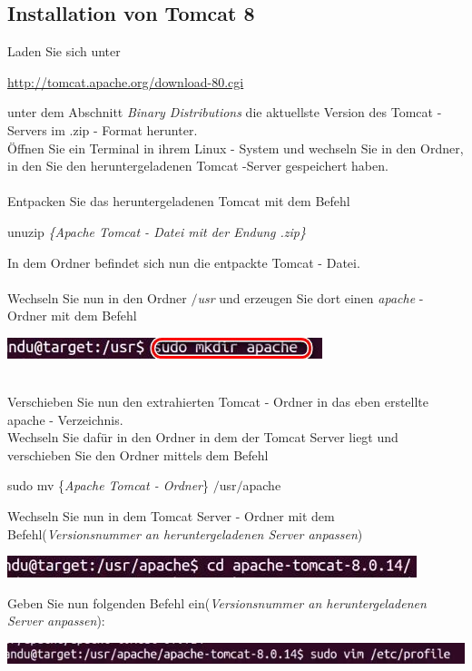 \documentclass[a4paper, 12pt]{scrreprt}
\begin{document}
\subsection{Installation von Tomcat 8}
Laden Sie sich unter 
\begin{center}
	\url{http://tomcat.apache.org/download-80.cgi}
\end{center}
unter dem Abschnitt {\it Binary Distributions} die aktuellste Version des Tomcat - Servers im .zip - Format herunter.\\
Öffnen Sie ein Terminal in ihrem Linux - System und wechseln Sie in den Ordner, in den Sie den heruntergeladenen Tomcat -Server gespeichert haben.\\
\ \\
Entpacken Sie das heruntergeladenen Tomcat mit dem Befehl
\begin{center}
	unuzip  {\it \{Apache Tomcat - Datei mit der Endung .zip\} }
\end{center}
In dem Ordner befindet sich nun die entpackte Tomcat - Datei.\\
\ \\
Wechseln Sie nun in den Ordner {\it $/$usr} und erzeugen Sie dort einen {\it apache} - Ordner mit dem Befehl
\begin{center}
\includegraphics[width=0.5\linewidth]{Grafiken/apache_linux_path}
\end{center}
\ \\
Verschieben Sie nun den extrahierten Tomcat - Ordner in das eben erstellte apache - Verzeichnis.\\
Wechseln Sie dafür in den Ordner in dem der Tomcat Server liegt und verschieben Sie den Ordner mittels dem Befehl
\begin{center}
	sudo mv \{{\it Apache Tomcat - Ordner}\} $/$usr$/$apache
\end{center}
Wechseln Sie nun in dem Tomcat Server - Ordner mit dem Befehl({\it Versionsnummer an heruntergeladenen Server anpassen})
\begin{center}
\includegraphics[width=0.65\linewidth]{Grafiken/wechseln_server_ordner}
\end{center}
Geben Sie nun folgenden Befehl ein({\it Versionsnummer an heruntergeladenen Server anpassen}):
\begin{center}
\includegraphics[width=0.9\linewidth]{Grafiken/Befhel}
\end{center}
\end{document}
